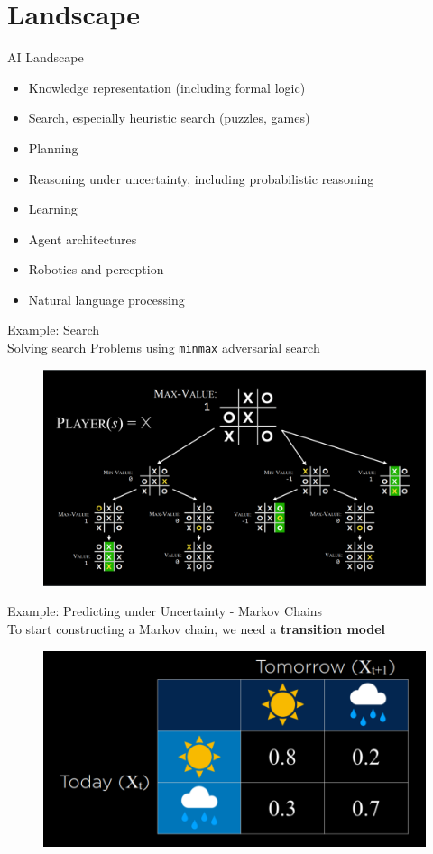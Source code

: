 \documentclass{beamer}
\begin{document}
\section{Landscape}
\label{sec:AILandscape}
\begin{frame}[allowframebreaks]{AI Landscape}
\begin{itemize}
\item Knowledge representation (including formal logic)
\item Search, especially heuristic search (puzzles, games)
\item Planning
\item Reasoning under uncertainty, including probabilistic reasoning
\item Learning
\item Agent architectures
\item Robotics and perception
\item Natural language processing
\end{itemize}
\framebreak
{\large Example: Search}\\
Solving search Problems using \texttt{minmax} adversarial search
\begin{figure}
\centering
\captionsetup{justification=centering}
\includegraphics[scale=0.30]{minimax_tictactoe.png}
\end{figure}
\framebreak
{\large Example: Predicting under Uncertainty - Markov Chains}\\
To start constructing a Markov chain, we need a \textbf{transition model}
\begin{figure}
\centering
\captionsetup{justification=centering}
\includegraphics[scale=0.25]{transitionmodel.png}

\end{figure}
\end{frame}
\end{document}
